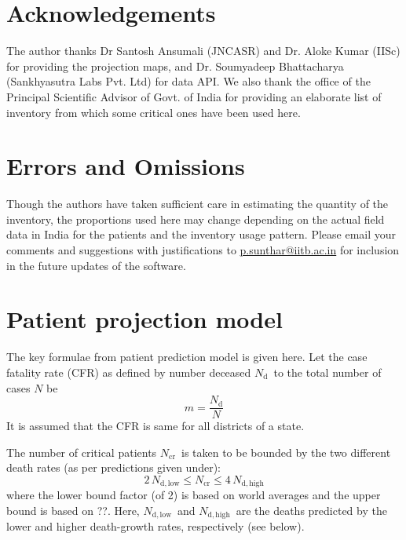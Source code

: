 \documentclass{article}
\newcommand{\email}[1]{\href{mailto:#1}{#1}}
\newcommand{\nd}{\ensuremath{N_{\mathrm{d}}}}
\newcommand{\ndl}{\ensuremath{N_{\mathrm{d,low}}}}
\newcommand{\ndh}{\ensuremath{N_{\mathrm{d,high}}}}
\newcommand{\ncr}{\ensuremath{N_{\mathrm{cr}}}}
\begin{document}
\section{Acknowledgements}
The author thanks Dr Santosh Ansumali (JNCASR) and Dr. Aloke Kumar
(IISc) for providing the projection maps, and Dr. Soumyadeep
Bhattacharya (Sankhyasutra Labs Pvt. Ltd) for data API. We also thank
the office of the Principal Scientific Advisor of Govt. of India for
providing an elaborate list of inventory from which some critical ones
have been used here.

\section{Errors and Omissions}
Though the authors have taken sufficient care in estimating the
quantity of the inventory, the proportions used here may change
depending on the actual field data in India for the patients and the
inventory usage pattern.  Please email your comments and suggestions
with justifications to \email{p.sunthar@iitb.ac.in} for inclusion in the
future updates of the software.

\appendix
\section{Patient projection model}
The key formulae from patient prediction model \cite{ansualok20} is
given here. Let the case fatality rate (CFR) as defined by number
deceased \nd\ to
the total number of cases $N$ be
\begin{equation}
  m = \frac{\nd}{N}
\end{equation}
It is assumed that the CFR is same for all districts of a state.


The number of critical patients \ncr\ is taken to be bounded by the
two different death rates (as per predictions given under):
\begin{equation}
  2 \, \ndl \leq \ncr \leq 4 \, \ndh
\end{equation}
where the lower bound factor (of 2) is based on world averages\cite{who19mar} and
the upper bound is based on ??. Here, \ndl\ and \ndh\ are the deaths predicted by
the lower and higher death-growth rates, respectively (see below). 
\end{document}
